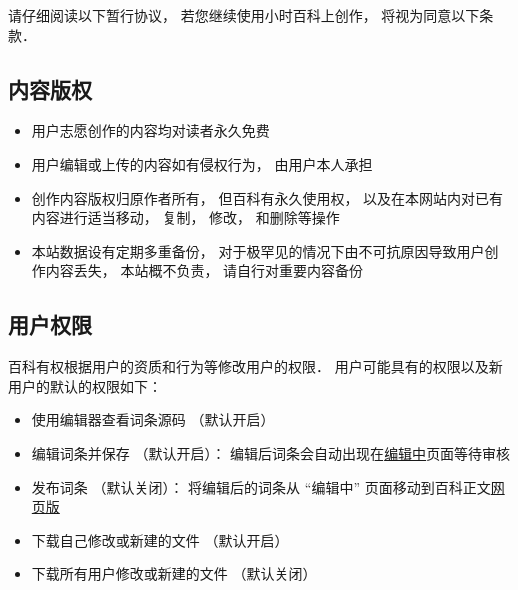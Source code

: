 
请仔细阅读以下暂行协议， 若您继续使用小时百科上创作， 将视为同意以下条款．

\subsection{内容版权}
\begin{itemize}
\item 用户志愿创作的内容均对读者永久免费
\item 用户编辑或上传的内容如有侵权行为， 由用户本人承担
\item 创作内容版权归原作者所有， 但百科有永久使用权， 以及在本网站内对已有内容进行适当移动， 复制， 修改， 和删除等操作
\item 本站数据设有定期多重备份， 对于极罕见的情况下由不可抗原因导致用户创作内容丢失， 本站概不负责， 请自行对重要内容备份
\end{itemize}

\subsection{用户权限}
百科有权根据用户的资质和行为等修改用户的权限． 用户可能具有的权限以及新用户的默认的权限如下：
\begin{itemize}
\item 使用编辑器查看词条源码 （默认开启）
\item 编辑词条并保存 （默认开启）： 编辑后词条会自动出现在\href{http://wuli.wiki/changed}{编辑中}页面等待审核
\item 发布词条 （默认关闭）： 将编辑后的词条从 “编辑中” 页面移动到百科正文\href{http://wuli.wiki/online}{网页版}
\item 下载自己修改或新建的文件 （默认开启）
\item 下载所有用户修改或新建的文件 （默认关闭）
\end{itemize}
